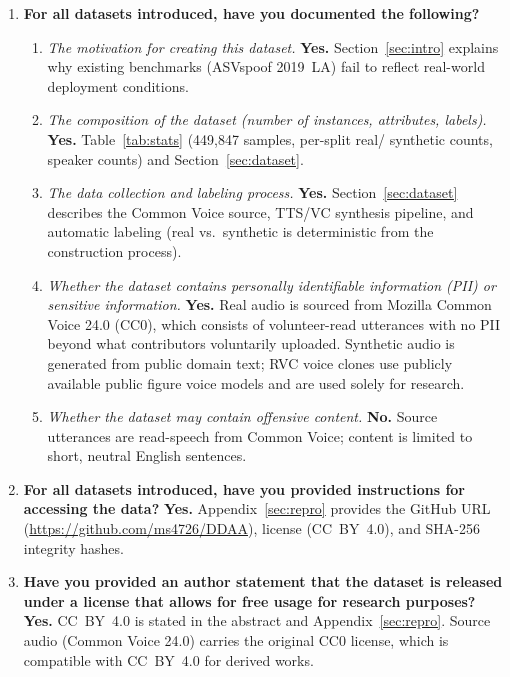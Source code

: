 \documentclass{article}
\begin{document}
\begin{enumerate}

  \item \textbf{For all datasets introduced, have you documented the
    following?}
  \begin{enumerate}
    \item \textit{The motivation for creating this dataset.}
      \textbf{Yes.} Section~\ref{sec:intro} explains why existing benchmarks
      (ASVspoof 2019~LA) fail to reflect real-world deployment conditions.
    \item \textit{The composition of the dataset (number of instances,
      attributes, labels).}
      \textbf{Yes.} Table~\ref{tab:stats} (449,847 samples, per-split real/
      synthetic counts, speaker counts) and Section~\ref{sec:dataset}.
    \item \textit{The data collection and labeling process.}
      \textbf{Yes.} Section~\ref{sec:dataset} describes the Common Voice
      source, TTS/VC synthesis pipeline, and automatic labeling (real vs.\
      synthetic is deterministic from the construction process).
    \item \textit{Whether the dataset contains personally identifiable
      information (PII) or sensitive information.}
      \textbf{Yes.} Real audio is sourced from Mozilla Common Voice 24.0
      (CC0), which consists of volunteer-read utterances with no PII beyond
      what contributors voluntarily uploaded.  Synthetic audio is generated
      from public domain text; RVC voice clones use publicly available
      public figure voice models and are used solely for research.
    \item \textit{Whether the dataset may contain offensive content.}
      \textbf{No.} Source utterances are read-speech from Common Voice;
      content is limited to short, neutral English sentences.
  \end{enumerate}

  \item \textbf{For all datasets introduced, have you provided instructions
    for accessing the data?}
    \textbf{Yes.}  Appendix~\ref{sec:repro} provides the GitHub URL
    (\url{https://github.com/ms4726/DDAA}), license (CC~BY~4.0), and
    SHA-256 integrity hashes.

  \item \textbf{Have you provided an author statement that the dataset is
    released under a license that allows for free usage for research purposes?}
    \textbf{Yes.}  CC~BY~4.0 is stated in the abstract and
    Appendix~\ref{sec:repro}.  Source audio (Common Voice 24.0) carries the
    original CC0 license, which is compatible with CC~BY~4.0 for derived
    works.


\end{enumerate}
\end{document}
